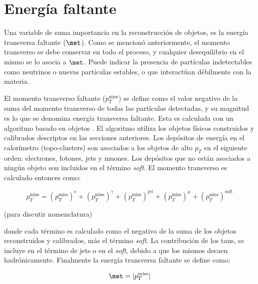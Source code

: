 \section{Energía faltante}

Una variable de suma importancia en la reconstrucción de objetos, es la energía transversa faltante ($\met$). Como se mencionó anteriormente, el momento transverso se debe conservar en todo el proceso, y cualquier desequilibrio en el mismo se lo asocia a $\met$. Puede indicar la presencia de partículas indetectables como neutrinos o nuevas partículas estables, o que interactúan débilmente con la materia.

El momento transverso faltante ($p_{T}^{\text{miss}}$) se define como el valor negativo de la suma del momento transverso de todas las partículas detectadas, y su magnitud es lo que se denomina energía transversa faltante. Esta es calculada con un algoritmo basado en objetos \cite{Khoo:2012749}. El algoritmo utiliza los objetos físicos construidos y calibrados descriptos en las secciones anteriores. Los depósitos de energía en el calorímetro (topo-clusters) son asociados a los objetos de alto $p_{T}$ en el siguiente orden: electrones, fotones, jets y muones. Los depósitos que no están asociados a ningún objeto son incluidos en el término \textit{soft}. El momento transverso es calculado entonces como:

\begin{equation}
p_{T}^{\text{miss}}=\left(p_{T}^{\text{miss}}\right)^{e} + \left(p_{T}^{\text{miss}}\right)^{\gamma} + \left(p_{T}^{\text{miss}}\right)^{\text{jet}} +\left(p_{T}^{\text{miss}}\right)^{\mu} + \left(p_{T}^{\text{miss}}\right)^{\text{soft}}
\end{equation}

(para discutir nomenclatura)

donde cada término es calculado como el negativo de la suma de los objetos reconstruidos y calibrados, más el término \textit{soft}. La contribución de los taus, se incluye en el término de jets o en el \textit{soft}, debido a que los mismos decaen hadrónicamente. Finalmente la energía transversa faltante se define como:

\begin{equation}
\met=|p_{T}^{\text{miss}}|
\end{equation}

